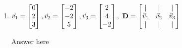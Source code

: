 \documentclass[11pt]{article}
\begin{document}
\begin{enumerate}
\begin{enumerate}
            \item $\vec{v}_1 = \begin{bmatrix}0\\2\\3\end{bmatrix}, \vec{v}_2 = \begin{bmatrix}-2\\-2\\5 \end{bmatrix}, \vec{v}_3 = \begin{bmatrix} 2\\4\\-2 \end{bmatrix}, \ \mbox{{\bfseries D}} = \begin{bmatrix}\vert&\vert&\vert \\ \vec{v}_1&\vec{v}_2&\vec{v}_3 \\ \vert&\vert&\vert \end{bmatrix}$
            \begin{Answer}
                Answer here
            \end{Answer}
        \end{enumerate}
    \end{enumerate}
\end{document}
